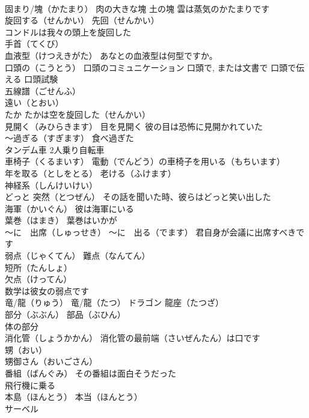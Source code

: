\documentclass[8pt]{extreport}
\begin{document}
\begin{CJK}{UTF8}{min}
\\	固まり/塊（かたまり） 肉の大きな塊 土の塊 雲は蒸気のかたまりです
\\	旋回する（せんかい） 先回（せんかい） 
\\	コンドルは我々の頭上を旋回した
\\	手首（てくび）
\\	血液型（けつえきがた） あなとの血液型は何型ですか。
\\	口頭の（こうとう） 口頭のコミュニケーション 口頭で, または文書で 口頭で伝える 口頭試験
\\	五線譜（ごせんふ）
\\	遠い（とおい）
\\	たか たかは空を旋回した（せんかい）
\\	見開く（みひらきます） 目を見開く 彼の目は恐怖に見開かれていた
\\	～過ぎる（すぎます） 食べ過ぎた
\\	タンデム車 2人乗り自転車
\\	車椅子（くるまいす） 電動（でんどう）の車椅子を用いる（もちいます）
\\	年を取る（としをとる） 老ける（ふけます）
\\	神経系（しんけいけい）
\\	どっと 突然（とつぜん） その話を聞いた時、彼らはどっと笑い出した
\\	海軍（かいぐん） 彼は海軍にいる
\\	葉巻（はまき） 葉巻はいかが
\\	～に　出席（しゅっせき） ～に　出る（でます） 君自身が会議に出席すべきです
\\	弱点（じゃくてん） 難点（なんてん）
\\	短所（たんしょ）
\\	欠点（けってん）
\\	数学は彼女の弱点です
\\	竜/龍（りゅう） 竜/龍（たつ） ドラゴン 龍座（たつざ）
\\	部分（ぶぶん） 部品（ぶひん） 
\\	体の部分
\\	消化管（しょうかかん） 消化管の最前端（さいぜんたん）は口です
\\	甥（おい）
\\	甥御さん（おいごさん）
\\	番組（ばんぐみ） その番組は面白そうだった
\\	飛行機に乗る
\\	本島（ほんとう） 本当（ほんとう） 
\\	サーベル

\end{CJK}
\end{document}
